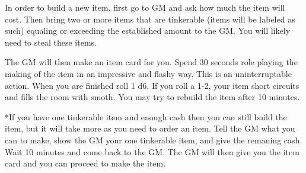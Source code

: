 \documentclass[green]{LRSguildcamp1}
\begin{document}
\name{\gTinkering{}}

In order to build a new item, first go to GM and ask how much the item will cost. Then bring two or more items that are tinkerable (items will be labeled as such) equaling or exceeding the established amount to the GM. You will likely need to steal these items.  

The GM will then make an item card for you. Spend 30 seconds role playing the making of the item in an impressive and flashy way. This is an uninterruptable action. When you are finished roll 1 d6.  If you roll a 1-2, your item short circuits and fills the room with smoth. You may try to rebuild the item after 10 minutes. 

*If you have one tinkerable item and enough cash then you can still build the item, but it will take more as you need to order an item. Tell the GM what you can to make, show the GM your one tinkerable item, and give the remaning cash. Wait 10 minutes and come back to the GM. The GM will then give you the item card and you can proceed to make the item. 

\end{document}
